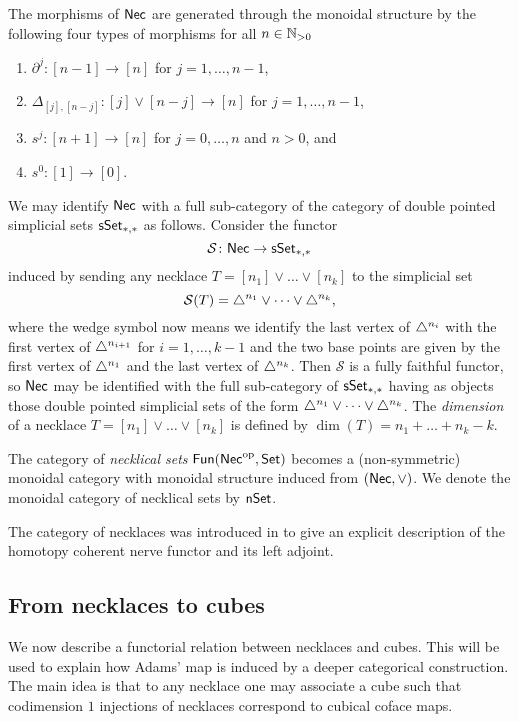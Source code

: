 The morphisms of $\mathsf{Nec}$ are generated through the monoidal structure by the following four types of morphisms for all $n \in\mathbb{N}_{>0} $
\begin{enumerate}
	\item $\partial^j \colon [n-1] \to [n]$ for $j = 1, \dots, n-1$,
	\item $\Delta_{[j], [n-j]} \colon [j] \vee [n-j] \to [n]$ for $j = 1, \dots, n-1$,
	\item $s^j \colon [n+1] \to [n]$ for $j = 0, \dots, n$ and $n>0$, and
	\item $s^0 \colon [1] \to [0]$.
\end{enumerate}
We may identify $\mathsf{Nec}$ with a full sub-category of the category of double pointed simplicial sets $\mathsf{sSet}_{*,*}$ as follows.
Consider the functor
\[
\mathcal{S} \colon \mathsf{Nec} \to \mathsf{sSet}_{*,*}
\]
induced by sending any necklace $T = [n_1] \vee \dots \vee[n_k]$ to the simplicial set
\[
\mathcal{S}(T) = \triangle^{n_1} \vee \dots \vee \triangle^{n_k},
\]
where the wedge symbol now means we identify the last vertex of $\triangle^{n_i}$ with the first vertex of $\triangle^{n_{i+1}}$ for $i = 1, \dots, k-1$ and the two base points are given by the first vertex of $\triangle^{n_1}$ and the last vertex of $\triangle^{n_k}$.
Then $\mathcal{S}$ is a fully faithful functor, so $\mathsf{Nec}$ may be identified with the full sub-category of $\mathsf{sSet}_{*,*}$ having as objects those double pointed simplicial sets of the form $\triangle^{n_1} \vee \dots \vee \triangle^{n_k}$.
The \textit{dimension} of a necklace $T = [n_1] \vee \dots \vee[n_k]$ is defined by $\dim(T) = n_1 + \dots + n_k-k$.

The category of \textit{necklical sets} $\mathsf{Fun}(\mathsf{Nec}^{\mathrm{op}}, \mathsf{Set})$ %
becomes a (non-symmetric) monoidal category with monoidal structure induced from $(\mathsf{Nec}, \vee)$. We denote the monoidal category of necklical sets by $\mathsf{nSet}$.

\begin{remark} The category of necklaces was introduced in \cite{dugger2011rigidification} to give an explicit description of the homotopy coherent nerve functor and its left adjoint. 
\end{remark}

\subsection{From necklaces to cubes} We now describe a functorial relation between necklaces and cubes. This will be used to explain how Adams' map is induced by a deeper categorical construction. The main idea is that to any necklace one may associate a cube such that codimension $1$ injections of necklaces correspond to cubical coface maps. 

